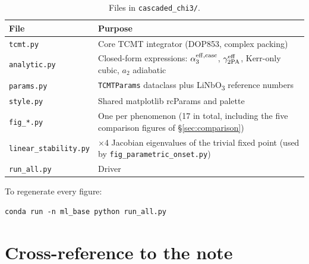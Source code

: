 \documentclass[11pt,a4paper]{article}
\newcommand{\effc}{{\rm eff,casc}}
\begin{document}
\begin{table}[H]
\centering
\small
\begin{tabular}{>{\raggedright\arraybackslash}p{}
                >{\raggedright\arraybackslash}p{}}
\toprule
File & Purpose \\
\midrule
\texttt{tcmt.py} & Core TCMT integrator (DOP853, complex packing) \\
\texttt{analytic.py} & Closed-form expressions: $\alpha_3^{\effc}$,
$\gamma_{2{\rm PA}}^{\rm eff}$, Kerr-only cubic, $a_2$ adiabatic \\
\texttt{params.py} & \texttt{TCMTParams} dataclass plus
LiNbO\textsubscript{3} reference numbers \\
\texttt{style.py} & Shared matplotlib rcParams and palette \\
\texttt{fig\_*.py} & One per phenomenon (17 in total, including the
   five comparison figures of \S\ref{sec:comparison}) \\
\texttt{linear\_stability.py} & 4$\times$4 Jacobian eigenvalues of the
   trivial fixed point (used by \texttt{fig\_parametric\_onset.py}) \\
\texttt{run\_all.py} & Driver \\
\bottomrule
\end{tabular}
\caption{Files in \texttt{cascaded\_chi3/}.}
\label{tab:code}
\end{table}

To regenerate every figure:
\begin{verbatim}
conda run -n ml_base python run_all.py
\end{verbatim}

\section{Cross-reference to the note}
\label{sec:cross}
\end{document}
